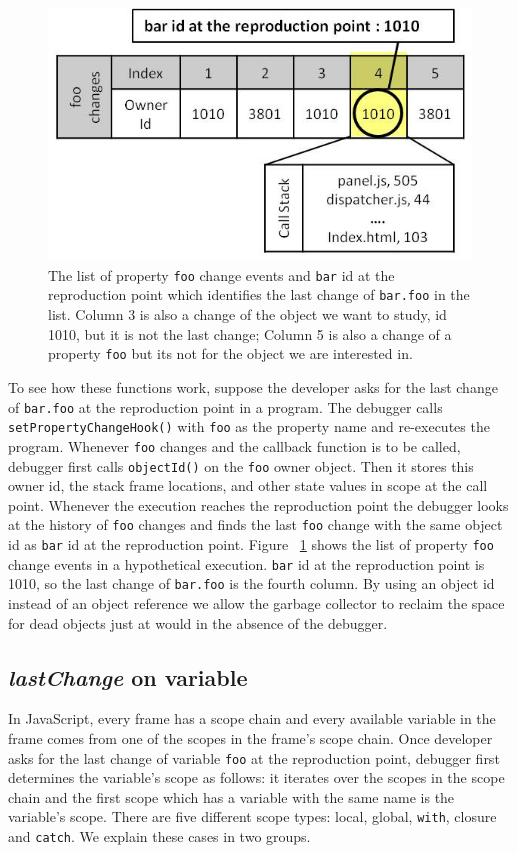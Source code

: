 \documentclass[preprint]{sigplanconf}
\begin{document}
\begin{figure}[htp]
\includegraphics[width=.48\textwidth]{6-foo-changes1.jpg}
\caption{The list of property \texttt{foo} change events and
  \texttt{bar} id at the reproduction point which identifies the last
  change of \texttt{bar.foo} in the list. Column 3 is also a change of
  the object we want to study, id 1010, but it is not the last change;
  Column 5 is also a change of a property \texttt{foo} but its not for
  the object we are interested in.}
\label{fig:foo-changes1}
\end{figure}

To see how these functions work, suppose the developer asks for the
last change of \texttt{bar.foo} at the reproduction point in a
program. The debugger calls \texttt{setPropertyChangeHook()} with
\texttt{foo} as the property name and re-executes the
program. Whenever \texttt{foo} changes and the callback function is to
be called, debugger first calls \texttt{objectId()} on the
\texttt{foo} owner object. Then it stores this owner id, the stack
frame locations, and other state values in scope at the call point.
Whenever the execution reaches the reproduction point the debugger
looks at the history of \texttt{foo} changes and finds the last
\texttt{foo} change with the same object id as \texttt{bar} id at the
reproduction point. Figure ~\ref{fig:foo-changes1} shows the list of
property \texttt{foo} change events in a hypothetical
execution. \texttt{bar} id at the reproduction point is 1010, so the
last change of \texttt{bar.foo} is the fourth column.  By using an
object id instead of an object reference we allow the garbage
collector to reclaim the space for dead objects just at would in the
absence of the debugger.

\subsection{\textit{lastChange} on variable} 
In JavaScript, every frame has a scope chain and every available
variable in the frame comes from one of the scopes in the frame's
scope chain. Once developer asks for the last change of variable
\texttt{foo} at the reproduction point, debugger first determines the
variable's scope as follows: it iterates over the scopes in the scope
chain and the first scope which has a variable with the same name is
the variable's scope. There are five different scope types: local,
global, \texttt{with}, closure and \texttt{catch}. We explain these
cases in two groups.
\end{document}
